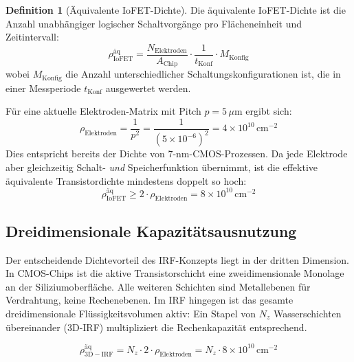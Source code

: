﻿\documentclass[a4paper,12pt]{scrreprt}
\theoremstyle{definition}
\newtheorem{definition}{Definition}[section]
\begin{document}
\begin{definition}[Äquivalente IoFET-Dichte]
	Die äquivalente IoFET-Dichte ist die Anzahl unabhängiger logischer
	Schaltvorgänge pro Flächeneinheit und Zeitintervall:
	\begin{equation}
		\rho_{\mathrm{IoFET}}^{\mathrm{äq}} = \frac{N_{\mathrm{Elektroden}}}{A_{\mathrm{Chip}}} \cdot
		\frac{1}{t_{\mathrm{Konf}}} \cdot M_{\mathrm{Konfig}}
		\label{eq:aequivalente_dichte}
	\end{equation}
	wobei $M_{\mathrm{Konfig}}$ die Anzahl unterschiedlicher Schaltungskonfigurationen
	ist, die in einer Messperiode $t_{\mathrm{Konf}}$ ausgewertet werden.
\end{definition}

Für eine aktuelle Elektroden-Matrix mit Pitch $p = 5\,\mu$m ergibt sich:
\begin{equation}
	\rho_{\mathrm{Elektroden}} = \frac{1}{p^2} = \frac{1}{(5 \times 10^{-6})^2}
	= 4 \times 10^{10}\,\text{cm}^{-2}
	\label{eq:elektrodendichte}
\end{equation}
Dies entspricht bereits der Dichte von 7-nm-CMOS-Prozessen. Da jede Elektrode
aber gleichzeitig Schalt- \emph{und} Speicherfunktion übernimmt, ist die
effektive äquivalente Transistordichte mindestens doppelt so hoch:
\begin{equation}
	\rho_{\mathrm{IoFET}}^{\mathrm{äq}} \geq 2 \cdot \rho_{\mathrm{Elektroden}}
	= 8 \times 10^{10}\,\text{cm}^{-2}
	\label{eq:effektive_dichte}
\end{equation}

\subsection{Dreidimensionale Kapazitätsausnutzung}

Der entscheidende Dichtevorteil des IRF-Konzepts liegt in der dritten Dimension.
In CMOS-Chips ist die aktive Transistorschicht eine zweidimensionale Monolage an
der Siliziumoberfläche. Alle weiteren Schichten sind Metallebenen für Verdrahtung,
keine Rechenebenen. Im IRF hingegen ist das gesamte dreidimensionale Flüssigkeitsvolumen
aktiv: Ein Stapel von $N_z$ Wasserschichten übereinander (3D-IRF) multipliziert
die Rechenkapazität entsprechend.

\begin{equation}
	\rho_{\mathrm{3D-IRF}}^{\mathrm{äq}} = N_z \cdot 2 \cdot \rho_{\mathrm{Elektroden}}
	= N_z \cdot 8 \times 10^{10}\,\text{cm}^{-2}
	\label{eq:dreidimensionale_dichte}
\end{equation}
\end{document}
